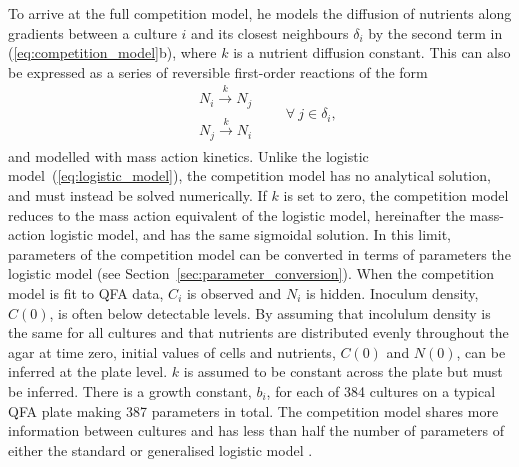 To arrive at the full competition model, he models the diffusion of
nutrients along gradients between a culture \(i\) and its closest
neighbours \(\delta_{i}\) by the second term in
(\ref{eq:competition_model}b), where \(k\) is a nutrient diffusion
constant. This can also be expressed as a series of reversible
first-order reactions of the form
\begin{equation}
  \label{eq:diffusion_reaction}
  \left.\begin{aligned}
  &N_{i} \xrightarrow[]{k} N_{j}\\
  &N_{j} \xrightarrow[]{k} N_{i}
       \end{aligned}
 \right.
 \qquad \forall~j \in \delta_{i},
\end{equation}
and modelled with mass action kinetics. Unlike the logistic
model~(\ref{eq:logistic_model}), the competition model has no
analytical solution, and must instead be solved numerically. If \(k\)
is set to zero, the competition model reduces to the mass action
equivalent of the logistic model, hereinafter the mass-action logistic
model, and has the same sigmoidal solution. In this limit, parameters
of the competition model can be converted in terms of parameters the
logistic model (see Section~\ref{sec:parameter_conversion}).
When the competition model is fit to QFA data, \(C_{i}\) is observed
and \(N_{i}\) is hidden. Inoculum density, \(C(0)\), is often below
detectable levels. By assuming that incolulum density is the same for
all cultures and that nutrients are distributed evenly throughout the
agar at time zero, initial values of cells and nutrients, \(C(0)\) and
\(N(0)\), can be inferred at the plate level. \(k\) is assumed to be
constant across the plate but must be inferred. There is a growth
constant, \(b_{i}\), for each of 384 cultures on a typical QFA plate
making 387 parameters in total. The competition model shares more
information between cultures and has less than half the number of
parameters of either the standard or generalised logistic model
\citep{Banks2012,qfa2016}.
